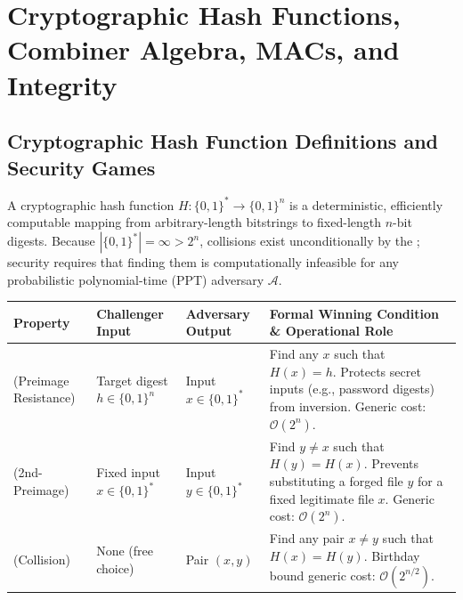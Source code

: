 \section{Cryptographic Hash Functions, Combiner Algebra, MACs, and Integrity}

\subsection{Cryptographic Hash Function Definitions and Security Games}
A cryptographic hash function $H : \{0,1\}^* \to \{0,1\}^n$ is a deterministic, efficiently computable mapping from arbitrary-length bitstrings to fixed-length $n$-bit digests. Because $|\{0,1\}^*| = \infty > 2^n$, collisions exist unconditionally by the ; security requires that finding them is computationally infeasible for any probabilistic polynomial-time (PPT) adversary $\mathcal{A}$.

\begin{table}[h!]
\centering
\footnotesize
\begin{tabularx}{\textwidth}{@{}L{3.4cm} L{2.8cm} L{2.6cm} Y@{}}
\toprule
\textbf{Property} & \textbf{Challenger Input} & \textbf{Adversary Output} & \textbf{Formal Winning Condition \& Operational Role} \\
\midrule
{} (Preimage Resistance) & Target digest $h \in \{0,1\}^n$ & Input $x \in \{0,1\}^*$ & Find any $x$ such that $H(x) = h$. Protects secret inputs (e.g., password digests) from inversion. Generic cost: $\mathcal{O}(2^n)$. \\
 (2nd-Preimage) & Fixed input $x \in \{0,1\}^*$ & Input $y \in \{0,1\}^*$ & Find $y \neq x$ such that $H(y) = H(x)$. Prevents substituting a forged file $y$ for a fixed legitimate file $x$. Generic cost: $\mathcal{O}(2^n)$. \\
 (Collision) & None (free choice) & Pair $(x, y)$ & Find any pair $x \neq y$ such that $H(x) = H(y)$. Birthday bound generic cost: $\mathcal{O}(2^{n/2})$. \\
\bottomrule
\end{tabularx}
\end{table}

